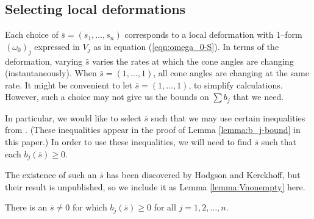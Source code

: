 

\subsection{Selecting local deformations}
  \label{subsec:Vnonempty}

Each choice of $\bar{s} = (s_1, \dots, s_n)$ corresponds to a local
deformation with 1--form $(\omega_0)_j$ expressed in $V_j$ as in
equation (\ref{eqn:omega_0-S}).
In terms of the deformation, varying $\bar{s}$ varies the rates at
which the cone angles are changing (instantaneously).  When
$\bar{s}=(1, \dots, 1)$, all cone angles are changing at the same
rate.  It might be convenient to let $\bar{s}=(1, \dots, 1)$, to
simplify calculations.  However, such a choice may not give us the
bounds on $\sum b_j$ that we need.

In particular, we would like to select $\bar{s}$ such that we may use
certain inequalities from \cite{hk:univ}.  (These inequalities appear
in the proof of Lemma \ref{lemma:b_j-bound} in this paper.)  In order
to use these inequalities, we will need to find $\bar{s}$ such that
each $b_j(\bar{s}) \geq 0$.

The existence of such an $\bar{s}$ has been discovered by
Hodgson and Kerckhoff, but their result is unpublished, so we include
it as Lemma \ref{lemma:Vnonempty} here.

\begin{lemma}  There is an $\bar{s}\neq 0$ for which
$b_j(\bar{s})\geq 0$ for all $j=1, 2, \dots, n.$
\label{lemma:Vnonempty}
\end{lemma}

